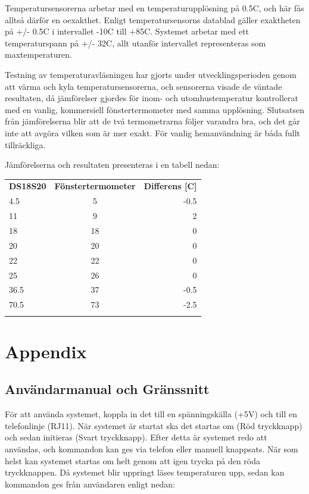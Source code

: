 \documentclass[a4paper,11pt]{article}
\begin{document}
Temperatursensorerna arbetar med en temperaturupplösning på 0.5C, och här fås alltså därför en oexakthet.
Enligt temperatursensorns datablad gäller exaktheten på +/- 0.5C i intervallet -10C till +85C.
Systemet arbetar med ett temperaturspann på +/- 32C, allt utanför intervallet representeras som maxtemperaturen.

Testning av temperaturavläsningen har gjorts under utvecklingsperioden genom att värma och kyla temperatursensorerna,
och sensorerna visade de väntade resultaten, då jämförelser gjordes för inom- och utomhustemperatur kontrollerat med
en vanlig, kommersiell fönstertermometer med samma upplösning. Slutsatsen från jämförelserna blir att de två 
termometrarna följer varandra bra, och det går inte att avgöra vilken som är mer exakt. För vanlig hemanvändning
är båda fullt tillräckliga.

Jämförelserna och resultaten presenteras i en tabell nedan: 

	\begin{tabular}{l c r}
		\\{\bf DS18S20} & {\bf Fönstertermometer} & {\bf Differens [C]}\\
		4.5 & 5 & -0.5\\		
		11 & 9 & 2\\		
		18 & 18 & 0\\
		20 & 20 & 0\\	
		22 & 22 & 0\\
		25 & 26 & 0\\		
		36.5 & 37 & -0.5\\
		70.5 & 73 & -2.5 \\\\
	\end{tabular}

\section{Appendix}

	\subsection{Användarmanual och Gränssnitt}

	För att använda systemet, koppla in det till en spänningskälla (+5V) och till en telefonlinje (RJ11).
	När systemet är startat ska det startas om (Röd tryckknapp) och sedan initieras (Svart tryckknapp).
	Efter detta är systemet redo att användas, och kommandon kan ges via telefon eller manuell knappsats.
	När som helst kan systemet startas om helt genom att igen trycka på den röda tryckknappen.
	Då systemet blir uppringt läses temperaturen upp, sedan kan kommandon ges från användaren enligt nedan:\\
\end{document}
